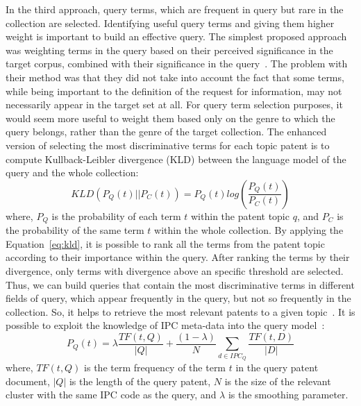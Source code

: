 In the third approach, query terms, which are frequent in query but rare in the collection are selected.
Identifying useful query terms and giving them higher weight is important to build an effective query. The simplest proposed approach was weighting terms in the query based on their perceived significance in the target corpus, combined with their significance in the query~\citep{itoh2003term}. The problem with their method was that they did not take into account the fact that some terms, while being important to the definition of the request for information, may not necessarily appear in the target set at all. For query term selection purposes, it would seem more useful to weight them based only on the genre to which the query belongs, rather than the genre of the target collection. The enhanced version of selecting the most discriminative terms for each topic patent is to compute Kullback-Leibler divergence (KLD) between the language model of the query and the whole collection:
\begin{equation}
\label{eq:kld}
 KLD(P_{Q}(t)||P_{C}(t)) = P_{Q}(t)log(\frac{P_{Q}(t)}{P_{C}(t)})  
\end{equation}
where, $ P_{Q} $ is the probability of each term $ t $ within the patent topic $ q $, and $ P_{C} $ is the probability of the same term $ t $ within the whole collection. 
By applying the Equation~\ref{eq:kld}, it is possible to rank all the terms from the patent topic according to their importance within the query. After ranking the terms by their divergence, only terms with divergence above an specific threshold are selected. Thus, we can build queries that contain the most discriminative terms in different fields of query, which appear frequently in the query, but not so frequently in the collection. So, it helps to retrieve the most relevant patents to a given topic~\citep{perez2010using}. It is possible to exploit the knowledge of IPC meta-data into the query model~\citep{mahdabi2011building}:
\begin{equation}
\label{eq:IPCmodel}
 P_{Q}(t) = \lambda\frac{TF(t,Q)}{|Q|}+\frac{(1-\lambda)}{N}\sum_{d\in IPC_{Q}}\frac{TF(t,D)}{|D|}  
\end{equation}
where, $ TF(t,Q) $ is the term frequency of the term $ t $ in the query patent document, $ |Q| $ is the length of the query patent, $ N $ is the size of the relevant cluster with the same IPC code as the query, and $ \lambda $ is the smoothing parameter.
